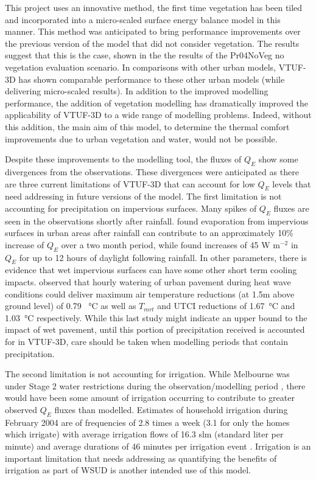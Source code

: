 \documentclass[final,3p,times,authoryear]{elsarticle}
\begin{document}
This project uses an innovative method, the first time vegetation has been tiled and incorporated into a micro-scaled surface energy balance model in this manner. This method was anticipated to bring performance improvements over the previous version of the model that did not consider vegetation. The results suggest that this is the case, shown in the the results of the Pr04NoVeg no vegetation evaluation scenario. In comparisons with other urban models, VTUF-3D has shown comparable performance to these other urban models (while delivering micro-scaled results). In addition to the improved modelling performance, the addition of vegetation modelling has dramatically improved the applicability of VTUF-3D to a wide range of modelling problems. Indeed, without this addition, the main aim of this model, to determine the thermal comfort improvements due to urban vegetation and water, would not be possible. 

Despite these improvements to the modelling tool, the fluxes of $Q_{E}$ show some divergences from the observations. These divergences were anticipated as there are three current limitations of VTUF-3D that can account for low $Q_{E}$ levels that need addressing in future versions of the model. The first limitation is not accounting for precipitation on impervious surfaces. Many spikes of $Q_{E}$ fluxes are seen in the observations shortly after rainfall. \cite{Demuzere2014} found evaporation from impervious surfaces in urban areas after rainfall can contribute to an approximately 10\% increase of $Q_{E}$ over a two month period, while \cite{Wouters2013} found increases of 45 W m$^{-2}$ in $Q_{E}$ for up to 12 hours of daylight following rainfall. In other parameters, there is evidence that wet impervious surfaces can have some other short term cooling impacts. \cite{Hendel2016} observed that hourly watering of urban pavement during heat wave conditions could deliver maximum air temperature reductions (at 1.5m above ground level) of 0.79 \SI{}{\degreeCelsius} as well as $T_{mrt}$ and UTCI reductions of 1.67\SI{}{\degreeCelsius} and 1.03\SI{}{\degreeCelsius} respectively. While this last study might indicate an upper bound to the impact of wet pavement, until this portion of precipitation received is accounted for in VTUF-3D, care should be taken when modelling periods that contain precipitation.

The second limitation is not accounting for irrigation. While Melbourne was under Stage 2 water restrictions during the observation/modelling period \citep{MelbourneWater2016a}, there would have been some amount of irrigation occurring to contribute to greater observed $Q_{E}$ fluxes than modelled. Estimates of household irrigation during February 2004 are of frequencies of 2.8 times a week (3.1 for only the homes which irrigate) with average irrigation flows of 16.3 slm (standard liter per minute) and average durations of 46 minutes per irrigation event \citep{Roberts2005}. Irrigation is an important limitation that needs addressing as quantifying the benefits of irrigation as part of WSUD is another intended use of this model. 
\end{document}

